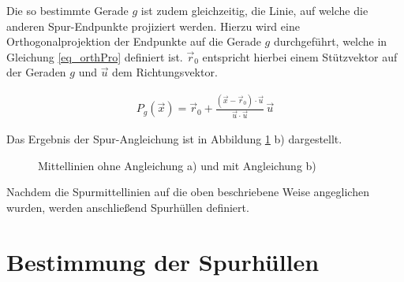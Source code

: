 Die so bestimmte Gerade $g$ ist zudem gleichzeitig, die Linie, auf welche die anderen Spur-Endpunkte
projiziert werden. Hierzu wird eine Orthogonalprojektion der Endpunkte auf die Gerade $g$ durchgeführt, welche
in Gleichung \ref{eq_orthPro} definiert ist. $\vec r_0$ entspricht hierbei einem Stützvektor auf der Geraden $g$ und
$\vec u$ dem Richtungsvektor.

\begin{ceqn}
\begin{align}
\label{eq_orthPro}
    P_g(\vec x) =  \vec r_0 + \frac{( \vec x - \vec r_0 ) \cdot \vec u}{\vec u \cdot \vec u} \, \vec u
\end{align}
\end{ceqn}

Das Ergebnis der Spur-Angleichung ist in Abbildung \ref{fig:real2_lane_alignment} b) dargestellt.

\begin{figure}[H]
    \centering
    \qquad \qquad
    \caption{Mittellinien ohne Angleichung a) und mit Angleichung b)}
    \label{fig:real2_lane_alignment}
\end{figure}

Nachdem die Spurmittellinien auf die oben beschriebene Weise angeglichen wurden, werden anschließend
Spurhüllen definiert.

\section{Bestimmung der Spurhüllen}
\label{sec:real2_define_lane_envelope}

